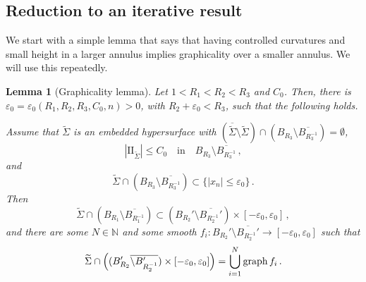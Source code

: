 \documentclass{article}
\newcommand{\N}{\mathbb{N}}
\newcommand{\ep}{\varepsilon}
\newtheorem{lemma}[theorem]{Lemma}
\theoremstyle{definition}
\begin{document}
\subsection{Reduction to an iterative result}
We start with a simple lemma that says that having controlled curvatures and small height in a larger annulus implies graphicality over a smaller annulus. We will use this repeatedly.
\begin{lemma}[Graphicality lemma]\label{lem:mf3rt7qwg0tba}
    Let $1<R_1<R_2<R_3$ and $C_0$. Then, there is $\ep_0=\ep_0(R_1,R_2,R_3,C_0,n)>0$, with $R_2+\ep_0< R_3$, such that the following holds.
    
    Assume that $\widetilde\Sigma$ is an embedded hypersurface with $(\overline{\widetilde \Sigma}\setminus \widetilde \Sigma) \cap (B_{R_3}\setminus \overline{B_{R_3^{-1}}})=\emptyset$,
    $$|\mathrm{II}_{\widetilde\Sigma}|\leq C_0\quad\mbox{in}\quad B_{R_3}\setminus \overline{B_{R_3^{-1}}}\,,$$
    and
    $$
    \widetilde\Sigma\cap (B_{R_3}\setminus \overline{B_{R_3^{-1}}})\subset\{|x_n|\leq \ep_0\}\,.
    $$
    Then
    $$\widetilde\Sigma \cap (B_{R_1}\setminus \overline{B_{R_1^{-1}}})\subset (B_{R_2}'\setminus \overline{B_{R_2^{-1}}'})\times[-\ep_0,\ep_0]\,,$$
    and there are some $N\in\N$ and some smooth $f_i:B_{R_2}'\setminus \overline{B_{R_2^{-1}}'}\to [-\ep_0,\ep_0]$ such that
    $$\widetilde\Sigma \cap  \left((B_{R_2}'\overline{\setminus B_{R_2^{-1}}'})\times[-\ep_0,\ep_0]\right)=\bigcup_{i=1}^N {\rm graph}\, f_i\,.$$
\end{lemma}
\end{document}
